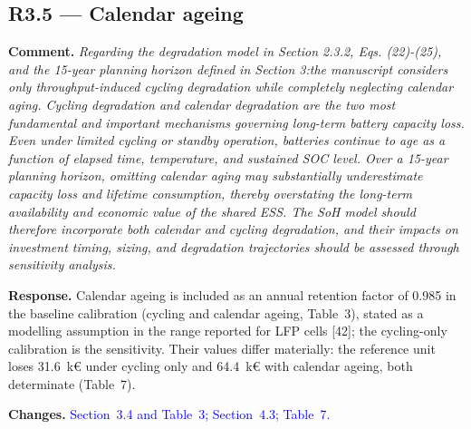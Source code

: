 \documentclass[11pt]{article}
\newcommand{\rcomment}[1]{\par\medskip\noindent\textbf{Comment.} \textit{#1}\par\smallskip}
\newcommand{\rresponse}[1]{\noindent\textbf{Response.} #1\par\smallskip}
\newcommand{\rchanges}[1]{\noindent\textbf{Changes.} \textcolor{blue}{#1}\par\medskip}
\begin{document}
\subsection*{R3.5 --- Calendar ageing}
\rcomment{
Regarding the degradation model in Section 2.3.2, Eqs. (22)-(25), and the 15-year planning horizon defined in Section 3:the manuscript considers only throughput-induced cycling degradation while completely neglecting calendar aging. Cycling degradation and calendar degradation are the two most fundamental and important mechanisms governing long-term battery capacity loss. Even under limited cycling or standby operation, batteries continue to age as a function of elapsed time, temperature, and sustained SOC level. Over a 15-year planning horizon, omitting calendar aging may substantially underestimate capacity loss and lifetime consumption, thereby overstating the long-term availability and economic value of the shared ESS. The SoH model should therefore incorporate both calendar and cycling degradation, and their impacts on investment timing, sizing, and degradation trajectories should be assessed through sensitivity analysis.
}
\rresponse{Calendar ageing is included as an annual retention factor of 0.985 in the baseline calibration (cycling and calendar ageing, Table~3), stated as a modelling assumption in the range reported for LFP cells [42]; the cycling-only calibration is the sensitivity. Their values differ materially: the reference unit loses 31.6~k\euro{} under cycling only and 64.4~k\euro{} with calendar ageing, both determinate (Table~7).}
\rchanges{Section~3.4 and Table~3; Section~4.3; Table~7.}
\end{document}
